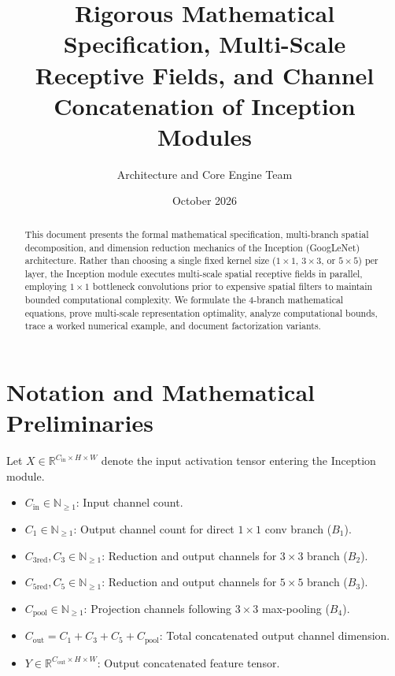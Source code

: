 \documentclass[11pt,a4paper]{article}
\title{\textbf{Rigorous Mathematical Specification, Multi-Scale Receptive Fields, and Channel Concatenation of Inception Modules}}
\author{Architecture and Core Engine Team}
\date{October 2026}
\theoremstyle{definition}
\begin{document}
\maketitle

\begin{abstract}
This document presents the formal mathematical specification, multi-branch spatial decomposition, and dimension reduction mechanics of the Inception (GoogLeNet) architecture. Rather than choosing a single fixed kernel size ($1 \times 1$, $3 \times 3$, or $5 \times 5$) per layer, the Inception module executes multi-scale spatial receptive fields in parallel, employing $1 \times 1$ bottleneck convolutions prior to expensive spatial filters to maintain bounded computational complexity. We formulate the 4-branch mathematical equations, prove multi-scale representation optimality, analyze computational bounds, trace a worked numerical example, and document factorization variants.
\end{abstract}

\section{Notation and Mathematical Preliminaries}

Let $X \in \mathbb{R}^{C_{\text{in}} \times H \times W}$ denote the input activation tensor entering the Inception module.

\begin{itemize}
    \item $C_{\text{in}} \in \mathbb{N}_{\ge 1}$: Input channel count.
    \item $C_1 \in \mathbb{N}_{\ge 1}$: Output channel count for direct $1 \times 1$ conv branch ($B_1$).
    \item $C_{3\text{red}}, C_3 \in \mathbb{N}_{\ge 1}$: Reduction and output channels for $3 \times 3$ branch ($B_2$).
    \item $C_{5\text{red}}, C_5 \in \mathbb{N}_{\ge 1}$: Reduction and output channels for $5 \times 5$ branch ($B_3$).
    \item $C_{\text{pool}} \in \mathbb{N}_{\ge 1}$: Projection channels following $3 \times 3$ max-pooling ($B_4$).
    \item $C_{\text{out}} = C_1 + C_3 + C_5 + C_{\text{pool}}$: Total concatenated output channel dimension.
    \item $Y \in \mathbb{R}^{C_{\text{out}} \times H \times W}$: Output concatenated feature tensor.
\end{itemize}
\end{document}
